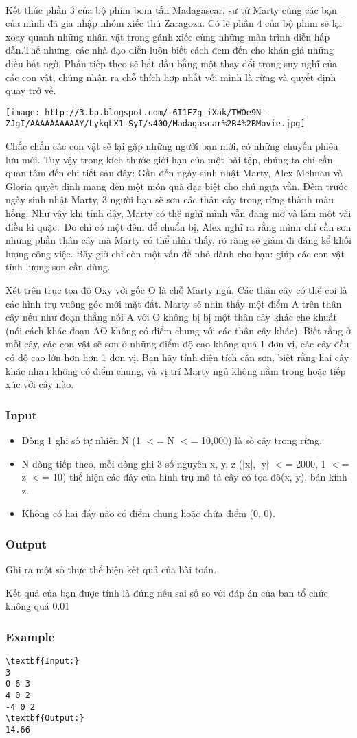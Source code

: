 

 

Kết thúc phần 3 của bộ phim bom tấn Madagascar, sư tử Marty cùng các bạn của mình đã gia nhập nhóm xiếc thú Zaragoza. Có lẽ phần 4 của bộ phim sẽ lại xoay quanh những nhân vật trong gánh xiếc cùng những màn trình diễn hấp dẫn.Thế nhưng, các nhà đạo diễn luôn biết cách đem đến cho khán giả những điều bất ngờ. Phần tiếp theo sẽ bắt đầu bằng một thay đổi trong suy nghĩ của các con vật, chúng nhận ra chỗ thích hợp nhất với mình là rừng và quyết định quay trở về.


\texttt{[image: http://3.bp.blogspot.com/-6I1FZg\_iXak/TWOe9N-ZJgI/AAAAAAAAAAY/LykqLX1\_SyI/s400/Madagascar\%2B4\%2BMovie.jpg]}

Chắc chắn các con vật sẽ lại gặp những người bạn mới, có những chuyến phiêu lưu mới. Tuy vậy trong kích thước giới hạn của một bài tập, chúng ta chỉ cần quan tâm đến chi tiết sau đây: Gần đến ngày sinh nhật Marty, Alex Melman và Gloria quyết định mang đến một món quà đặc biệt cho chú ngựa vằn. Đêm trước ngày sinh nhật Marty, 3 người bạn sẽ sơn các thân cây trong rừng thành màu hồng. Như vậy khi tỉnh dậy, Marty có thể nghĩ mình vẫn đang mơ và làm một vài điều kì quặc. Do chỉ có một đêm để chuẩn bị, Alex nghĩ ra rằng mình chỉ cần sơn những phần thân cây mà Marty có thể nhìn thấy, rõ ràng sẽ giảm đi đáng kể khối lượng công việc. Bây giờ chỉ còn một vấn đề nhỏ dành cho bạn: giúp các con vật tính lượng sơn cần dùng.

Xét trên trục tọa độ Oxy với gốc O là chỗ Marty ngủ. Các thân cây có thể coi là các hình trụ vuông góc mới mặt đất. Marty sẽ nhìn thấy một điểm A trên thân cây nếu như đoạn thẳng nối A với O không bị bị một thân cây khác che khuất (nói cách khác đoạn AO không có điểm chung với các thân cây khác). Biết rằng ở mỗi cây, các con vật sẽ sơn ở những điểm độ cao không quá 1 đơn vị, các cây đều có độ cao lớn hơn hơn 1 đơn vị. Bạn hãy tính diện tích cần sơn, biết rằng hai cây khác nhau không có điểm chung, và vị trí Marty ngủ không nằm trong hoặc tiếp xúc với cây nào.

\subsubsection{Input}
\begin{itemize}
	\item Dòng 1 ghi số tự nhiên N (1 $<$= N $<$= 10,000) là số cây trong rừng.
	\item N dòng tiếp theo, mỗi dòng ghi 3 số nguyên x, y, z (|x|, |y| $<$= 2000, 1 $<$= z $<$= 10) thể hiện các đáy của hình trụ mô tả cây có tọa đô(x, y), bán kính z.
	\item Không có hai đáy nào có điểm chung hoặc chứa điểm (0, 0).
\end{itemize}

\subsubsection{Output}

Ghi ra một số thực thể hiện kết quả của bài toán.

Kết quả của bạn được tính là đúng nếu sai số so với đáp án của ban tổ chức không quá 0.01

\subsubsection{Example}
\begin{verbatim}
\textbf{Input:}
3
0 6 3
4 0 2
-4 0 2
\textbf{Output:}
14.66\end{verbatim}